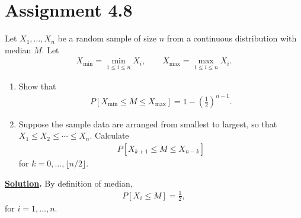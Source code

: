 \section*{Assignment 4.8}

Let $X_1, \ldots, X_n$ be a random sample of size $n$ from a continuous distribution with median $M$. Let
\begin{align*}
X_{\min} = \min_{1\leq i\leq n} X_i, \qquad X_{\max} = \max_{1\leq i\leq n}X_i.
\end{align*}
\begin{enumerate}
	\item Show that
	\begin{align*}
	P[X_{\min} \leq M \leq X_{\max}] = 1 - \left(\frac{1}{2} \right)^{n-1}.
	\end{align*}
	\item Suppose the sample data are arranged from smallest to largest, so that $X_1\leq X_2\leq \cdots \leq X_n$. Calculate 
	\begin{align*}
	P[X_{k+1} \leq M\leq X_{n-k}]
	\end{align*}
	for $k = 0, \ldots, \lfloor n/2\rfloor$.
\end{enumerate}
\textbf{\underline{Solution}.} By definition of median, 
\begin{align*}
P[X_i\leq M] = \frac{1}{2},
\end{align*}
for $i = 1, \ldots, n$.
